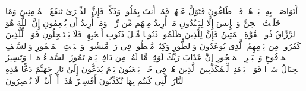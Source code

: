 \stopbuffer
\startbuffer[\q:51:53]
أَتَوَاصَوۡا۟ بِهِۦۚ بَلۡ هُمۡ قَوۡمࣱ طَاغُونَ%
\stopbuffer
\startbuffer[\q:51:54]
فَتَوَلَّ عَنۡهُمۡ فَمَاۤ أَنتَ بِمَلُومࣲ%
\stopbuffer
\startbuffer[\q:51:55]
وَذَكِّرۡ فَإِنَّ ٱلذِّكۡرَىٰ تَنفَعُ ٱلۡمُؤۡمِنِینَ%
\stopbuffer
\startbuffer[\q:51:56]
وَمَا خَلَقۡتُ ٱلۡجِنَّ وَٱلۡإِنسَ إِلَّا لِیَعۡبُدُونِ%
\stopbuffer
\startbuffer[\q:51:57]
مَاۤ أُرِیدُ مِنۡهُم مِّن رِّزۡقࣲ وَمَاۤ أُرِیدُ أَن یُطۡعِمُونِ%
\stopbuffer
\startbuffer[\q:51:58]
إِنَّ ٱللَّهَ هُوَ ٱلرَّزَّاقُ ذُو ٱلۡقُوَّةِ ٱلۡمَتِینُ%
\stopbuffer
\startbuffer[\q:51:59]
فَإِنَّ لِلَّذِینَ ظَلَمُوا۟ ذَنُوبࣰا مِّثۡلَ ذَنُوبِ أَصۡحَٰبِهِمۡ فَلَا یَسۡتَعۡجِلُونِ%
\stopbuffer
\startbuffer[\q:51:60]
فَوَیۡلࣱ لِّلَّذِینَ كَفَرُوا۟ مِن یَوۡمِهِمُ ٱلَّذِی یُوعَدُونَ%
\stopbuffer
\startbuffer[\q:52:1]
وَٱلطُّورِ%
\stopbuffer
\startbuffer[\q:52:2]
وَكِتَٰبࣲ مَّسۡطُورࣲ%
\stopbuffer
\startbuffer[\q:52:3]
فِی رَقࣲّ مَّنشُورࣲ%
\stopbuffer
\startbuffer[\q:52:4]
وَٱلۡبَیۡتِ ٱلۡمَعۡمُورِ%
\stopbuffer
\startbuffer[\q:52:5]
وَٱلسَّقۡفِ ٱلۡمَرۡفُوعِ%
\stopbuffer
\startbuffer[\q:52:6]
وَٱلۡبَحۡرِ ٱلۡمَسۡجُورِ%
\stopbuffer
\startbuffer[\q:52:7]
إِنَّ عَذَابَ رَبِّكَ لَوَٰقِعࣱ%
\stopbuffer
\startbuffer[\q:52:8]
مَّا لَهُۥ مِن دَافِعࣲ%
\stopbuffer
\startbuffer[\q:52:9]
یَوۡمَ تَمُورُ ٱلسَّمَاۤءُ مَوۡرࣰا%
\stopbuffer
\startbuffer[\q:52:10]
وَتَسِیرُ ٱلۡجِبَالُ سَیۡرࣰا%
\stopbuffer
\startbuffer[\q:52:11]
فَوَیۡلࣱ یَوۡمَئِذࣲ لِّلۡمُكَذِّبِینَ%
\stopbuffer
\startbuffer[\q:52:12]
ٱلَّذِینَ هُمۡ فِی خَوۡضࣲ یَلۡعَبُونَ%
\stopbuffer
\startbuffer[\q:52:13]
یَوۡمَ یُدَعُّونَ إِلَىٰ نَارِ جَهَنَّمَ دَعًّا%
\stopbuffer
\startbuffer[\q:52:14]
هَٰذِهِ ٱلنَّارُ ٱلَّتِی كُنتُم بِهَا تُكَذِّبُونَ%
\stopbuffer
\startbuffer[\q:52:15]
أَفَسِحۡرٌ هَٰذَاۤ أَمۡ أَنتُمۡ لَا تُبۡصِرُونَ%
\stopbuffer
